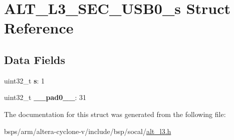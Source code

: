 \hypertarget{structALT__L3__SEC__USB0__s}{}\section{A\+L\+T\+\_\+\+L3\+\_\+\+S\+E\+C\+\_\+\+U\+S\+B0\+\_\+s Struct Reference}
\label{structALT__L3__SEC__USB0__s}
\subsection*{Data Fields}
\begin{DoxyCompactItemize}
\item 
\mbox{\label{structALT__L3__SEC__USB0__s_a0b2280f10e089ef0724a17075d34fa1a}} 
uint32\+\_\+t {\bfseries s}\+: 1
\item 
\mbox{\label{structALT__L3__SEC__USB0__s_ad2a2fc85bf86787ea5757a6a11978a53}} 
uint32\+\_\+t {\bfseries \+\_\+\+\_\+pad0\+\_\+\+\_\+}\+: 31
\end{DoxyCompactItemize}


The documentation for this struct was generated from the following file\+:\begin{DoxyCompactItemize}
\item 
bsps/arm/altera-\/cyclone-\/v/include/bsp/socal/\mbox{\hyperlink{alt__l3_8h}{alt\+\_\+l3.\+h}}\end{DoxyCompactItemize}
